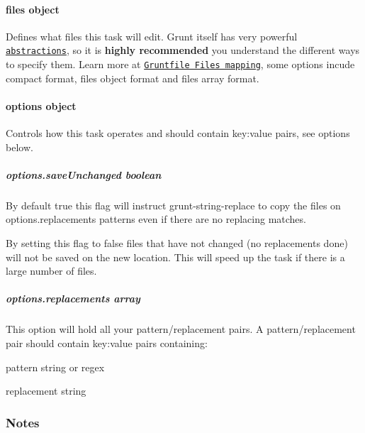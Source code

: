 \paragraph*{files {\ttfamily object}}

Defines what files this task will edit. Grunt itself has very powerful \href{http://gruntjs.com/configuring-tasks#files}{\tt abstractions}, so it is {\bfseries highly recommended} you understand the different ways to specify them. Learn more at \href{http://gruntjs.com/configuring-tasks#files}{\tt Gruntfile Files mapping}, some options incude compact format, files object format and files array format.

\paragraph*{options {\ttfamily object}}

Controls how this task operates and should contain key\+:value pairs, see options below.

\subparagraph*{options.\+save\+Unchanged {\ttfamily boolean}}

By default {\ttfamily true} this flag will instruct {\ttfamily grunt-\/string-\/replace} to copy the files on {\ttfamily options.\+replacements} patterns even if there are no replacing matches.

By setting this flag to {\ttfamily false} files that have not changed (no replacements done) will not be saved on the new location. This will speed up the task if there is a large number of files.

\subparagraph*{options.\+replacements {\ttfamily array}}

This option will hold all your pattern/replacement pairs. A pattern/replacement pair should contain key\+:value pairs containing\+:


\begin{DoxyItemize}
\item pattern {\ttfamily string} or {\ttfamily regex}
\item replacement {\ttfamily string}
\end{DoxyItemize}




\subsubsection*{Notes}


